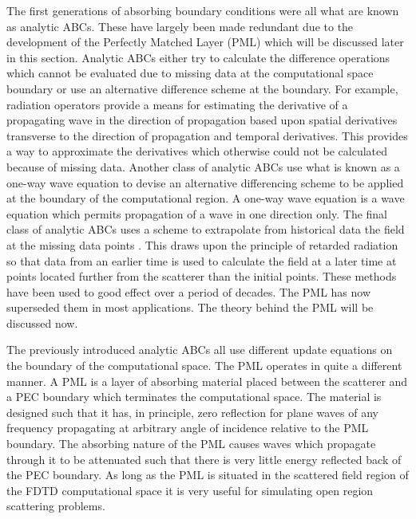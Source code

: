 \documentclass[a4paper, 12pt]{article}
\begin{document}
	The first generations of absorbing boundary conditions were all what
	are known as analytic ABCs. These have largely been made redundant due
	to the development of the Perfectly Matched Layer (PML) which will be
	discussed later in this section. Analytic ABCs either try to calculate
	the difference operations which cannot be evaluated due to missing
	data at the computational space boundary or use an alternative
	difference scheme at the boundary. For example, radiation operators
	\cite{bayliss82siamjappmath430,bayliss80commpapplmath707,higdon87mathcomp65,higdon86mathcomp437}
	provide a means for estimating the derivative of a propagating wave in
	the direction of propagation based upon spatial derivatives transverse
	to the direction of propagation and temporal derivatives. This
	provides a way to approximate the derivatives which otherwise could not
	be calculated because of missing data. Another class of analytic ABCs
	use what is known as a one-way wave equation
	\cite{engquist77mathcomp629,mur81ieeetransemc377,trefethen86mathcomp421}
	to devise an alternative differencing scheme to be applied at the
	boundary of the computational region. A one-way wave equation is a wave equation which permits
	propagation of a wave in one direction only. The final class of analytic
	ABCs uses a scheme to extrapolate from historical data the field at
	the missing data points \cite{taflove00book}. This draws upon the principle of retarded
	radiation so that data
	from an earlier time is used to calculate the field at a later time at
	points located further from the scatterer than the initial points. These
	methods have been used to good effect over a period of decades. The
	PML has now superseded them in most applications. The theory behind
	the PML will be discussed now.

	The previously introduced analytic ABCs all use different update
	equations on the boundary of the computational space. The PML operates
	in quite a different manner. A PML is a layer of absorbing material
	placed between the scatterer and a PEC boundary which terminates the
	computational space. The material is designed such that it has, in
	principle, zero reflection for plane waves of any frequency
	propagating at arbitrary angle of incidence relative to the PML
	boundary. The absorbing nature of the PML causes waves which
	propagate through it to be attenuated such that there is very little energy reflected
	back of the PEC boundary. As long as the PML is situated in the
	scattered field region of the FDTD computational space it is very
	useful for simulating open region scattering problems.
\end{document}
